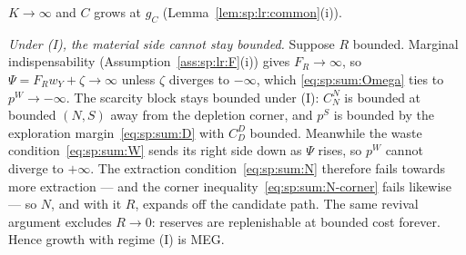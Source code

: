 $K\to\infty$ and $C$ grows at
$g_C$ (Lemma~\ref{lem:sp:lr:common}(i)).

\emph{Under (I), the material side cannot stay bounded.} Suppose $R$ bounded. Marginal
indispensability (Assumption~\ref{ass:sp:lr:F}(i)) gives $F_R\to\infty$, so
$\Psi=F_Rw_Y+\zeta\to\infty$ unless $\zeta$ diverges to $-\infty$, which
\eqref{eq:sp:sum:Omega} ties to $p^W\to-\infty$. The scarcity block stays bounded under (I):
$C^N_N$ is bounded at bounded $\left(N,S\right)$ away from the depletion corner, and $p^S$ is
bounded by the exploration margin~\eqref{eq:sp:sum:D} with $C^D_D$ bounded. Meanwhile the waste
condition~\eqref{eq:sp:sum:W} sends its right side down as $\Psi$ rises, so $p^W$ cannot
diverge to $+\infty$. The extraction condition~\eqref{eq:sp:sum:N} therefore fails towards more
extraction --- and the corner inequality~\eqref{eq:sp:sum:N-corner} fails likewise --- so $N$,
and with it $R$, expands off the candidate path. The same revival argument excludes $R\to0$:
reserves are replenishable at bounded cost forever. Hence growth with regime (I) is MEG.

